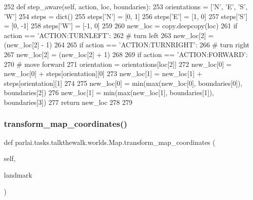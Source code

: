 \begin{DoxyCode}
252     \textcolor{keyword}{def }step\_aware(self, action, loc, boundaries):
253         orientations = [\textcolor{stringliteral}{'N'}, \textcolor{stringliteral}{'E'}, \textcolor{stringliteral}{'S'}, \textcolor{stringliteral}{'W'}]
254         steps = dict()
255         steps[\textcolor{stringliteral}{'N'}] = [0, 1]
256         steps[\textcolor{stringliteral}{'E'}] = [1, 0]
257         steps[\textcolor{stringliteral}{'S'}] = [0, -1]
258         steps[\textcolor{stringliteral}{'W'}] = [-1, 0]
259 
260         new\_loc = copy.deepcopy(loc)
261         \textcolor{keywordflow}{if} action == \textcolor{stringliteral}{'ACTION:TURNLEFT'}:
262             \textcolor{comment}{# turn left}
263             new\_loc[2] = (new\_loc[2] - 1) %
264 
265         \textcolor{keywordflow}{if} action == \textcolor{stringliteral}{'ACTION:TURNRIGHT'}:
266             \textcolor{comment}{# turn right}
267             new\_loc[2] = (new\_loc[2] + 1) %
268 
269         \textcolor{keywordflow}{if} action == \textcolor{stringliteral}{'ACTION:FORWARD'}:
270             \textcolor{comment}{# move forward}
271             orientation = orientations[loc[2]]
272             new\_loc[0] = new\_loc[0] + steps[orientation][0]
273             new\_loc[1] = new\_loc[1] + steps[orientation][1]
274 
275             new\_loc[0] = min(max(new\_loc[0], boundaries[0]), boundaries[2])
276             new\_loc[1] = min(max(new\_loc[1], boundaries[1]), boundaries[3])
277         \textcolor{keywordflow}{return} new\_loc
278 
279 
\end{DoxyCode}
\mbox{\label{classparlai_1_1tasks_1_1talkthewalk_1_1worlds_1_1Map_a2d84b1c786b7ed2dede242e909375711}} 
\subsubsection{\texorpdfstring{transform\+\_\+map\+\_\+coordinates()}{transform\_map\_coordinates()}}
{\footnotesize\ttfamily def parlai.\+tasks.\+talkthewalk.\+worlds.\+Map.\+transform\+\_\+map\+\_\+coordinates (\begin{DoxyParamCaption}\item[{}]{self,  }\item[{}]{landmark }\end{DoxyParamCaption})}



